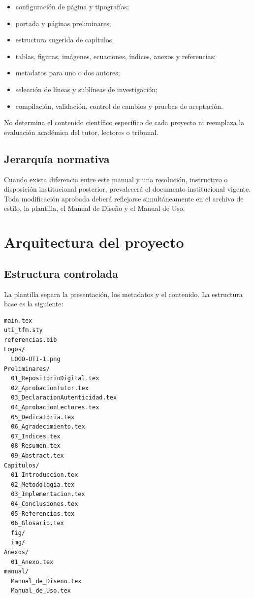\documentclass[12pt,a4paper,oneside]{report}
\begin{document}
\begin{itemize}
  \item configuración de página y tipografías;
  \item portada y páginas preliminares;
  \item estructura sugerida de capítulos;
  \item tablas, figuras, imágenes, ecuaciones, índices, anexos y referencias;
  \item metadatos para uno o dos autores;
  \item selección de líneas y sublíneas de investigación;
  \item compilación, validación, control de cambios y pruebas de aceptación.
\end{itemize}

No determina el contenido científico específico de cada proyecto ni reemplaza la evaluación académica del tutor, lectores o tribunal.

\section{Jerarquía normativa}

Cuando exista diferencia entre este manual y una resolución, instructivo o disposición institucional posterior, prevalecerá el documento institucional vigente. Toda modificación aprobada deberá reflejarse simultáneamente en el archivo de estilo, la plantilla, el Manual de Diseño y el Manual de Uso.

\chapter{Arquitectura del proyecto}

\section{Estructura controlada}

La plantilla separa la presentación, los metadatos y el contenido. La estructura base es la siguiente:

\begin{lstlisting}
main.tex
uti_tfm.sty
referencias.bib
Logos/
  LOGO-UTI-1.png
Preliminares/
  01_RepositorioDigital.tex
  02_AprobacionTutor.tex
  03_DeclaracionAutenticidad.tex
  04_AprobacionLectores.tex
  05_Dedicatoria.tex
  06_Agradecimiento.tex
  07_Indices.tex
  08_Resumen.tex
  09_Abstract.tex
Capitulos/
  01_Introduccion.tex
  02_Metodologia.tex
  03_Implementacion.tex
  04_Conclusiones.tex
  05_Referencias.tex
  06_Glosario.tex
  fig/
  img/
Anexos/
  01_Anexo.tex
manual/
  Manual_de_Diseno.tex
  Manual_de_Uso.tex
\end{lstlisting}
\end{document}
